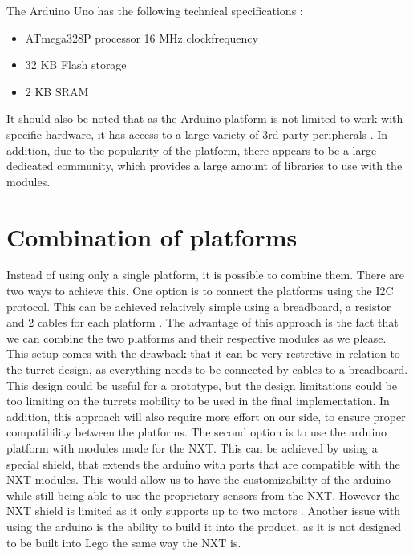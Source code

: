 The Arduino Uno has the following technical specifications \citep{UNOSpecs}:

\begin{itemize}
  \item ATmega328P processor 16 MHz clockfrequency
  \item 32 KB Flash storage
  \item 2 KB SRAM
\end{itemize}

It should also be noted that as the Arduino platform is not limited to work with
specific hardware, it has access to a large variety of 3rd party peripherals
. In addition, due
to the popularity of the platform, there appears to be a large dedicated community, which provides a large amount
of libraries to use with the modules.

\section{Combination of platforms}\label{CombPlat}
Instead of using only a single platform, it is possible to combine them. There
are two ways to achieve this. One option is to connect the platforms using the
I2C protocol. This can be achieved relatively simple using a breadboard, a
resistor and 2 cables for each platform \citep{ArduinoNXT}. The advantage of
this approach is the fact that we can combine the two platforms and their
respective modules as we please. This setup comes with the drawback that it can
be very restrctive in relation to the turret design, as everything needs to be
connected by cables to a breadboard. This design could be useful for a
prototype, but the design limitations could be too limiting on the turrets
mobility to be used in the final implementation. In addition, this approach will
also require more effort on our side, to ensure proper compatibility between the
platforms. The second option is to use the arduino platform with modules made
for the NXT. This can be achieved by using a special shield, that
extends the arduino with ports that are compatible with the NXT modules. This
would allow us to have the customizability of the arduino while still being able
to use the proprietary sensors from the NXT. However the NXT shield is limited
as it only supports up to two motors \citep{NXTShield}. Another issue with using
the arduino is the ability to build it into the product, as it is not designed
to be built into Lego the same way the NXT is.\nl

